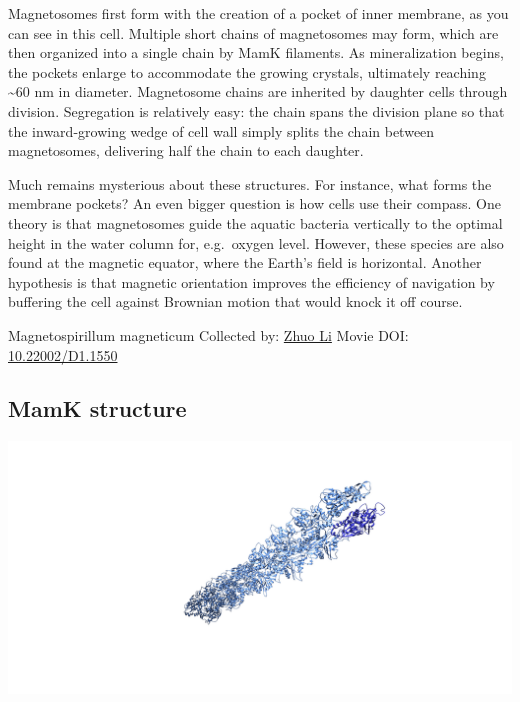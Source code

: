 \documentclass[]{tufte-book}
\begin{document}
Magnetosomes first form with the creation of a pocket of inner membrane, as you can see in this cell. Multiple short chains of magnetosomes may form, which are then organized into a single chain by MamK filaments. As mineralization begins, the pockets enlarge to accommodate the growing crystals, ultimately reaching \textasciitilde{}60 nm in diameter. Magnetosome chains are inherited by daughter cells through division. Segregation is relatively easy: the chain spans the division plane so that the inward-growing wedge of cell wall simply splits the chain between magnetosomes, delivering half the chain to each daughter.

Much remains mysterious about these structures. For instance, what forms the membrane pockets? An even bigger question is how cells use their compass. One theory is that magnetosomes guide the aquatic bacteria vertically to the optimal height in the water column for, e.g.~oxygen level. However, these species are also found at the magnetic equator, where the Earth's field is horizontal. Another hypothesis is that magnetic orientation improves the efficiency of navigation by buffering the cell against Brownian motion that would knock it off course.



\hypertarget{htmlwidget-0e1852b60647a1e1eb53}{}

\label{fig:7-6}Magnetospirillum magneticum Collected by: \protect\hyperlink{zhuo_li}{Zhuo Li} Movie DOI: \href{https://doi.org/10.22002/D1.1550}{10.22002/D1.1550}

\hypertarget{MamK_structure}{%
\subsection{MamK structure}\label{MamK_structure}}

\includegraphics{img/schematics/7_6_1}
\end{document}
